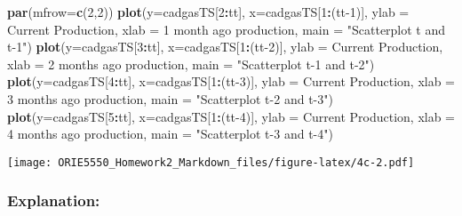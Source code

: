 \documentclass[
]{article}
\newenvironment{Shaded}{\begin{snugshade}}{\end{snugshade}}
\newcommand{\AttributeTok}[1]{\textcolor[rgb]{0.13,0.29,0.53}{#1}}
\newcommand{\DecValTok}[1]{\textcolor[rgb]{0.00,0.00,0.81}{#1}}
\newcommand{\FunctionTok}[1]{\textcolor[rgb]{0.13,0.29,0.53}{\textbf{#1}}}
\newcommand{\NormalTok}[1]{#1}
\newcommand{\SpecialCharTok}[1]{\textcolor[rgb]{0.81,0.36,0.00}{\textbf{#1}}}
\newcommand{\StringTok}[1]{\textcolor[rgb]{0.31,0.60,0.02}{#1}}
\begin{document}
\begin{Shaded}
\begin{Highlighting}[]
\FunctionTok{par}\NormalTok{(}\AttributeTok{mfrow=}\FunctionTok{c}\NormalTok{(}\DecValTok{2}\NormalTok{,}\DecValTok{2}\NormalTok{))}
\FunctionTok{plot}\NormalTok{(}\AttributeTok{y=}\NormalTok{cadgasTS[}\DecValTok{2}\SpecialCharTok{:}\NormalTok{tt], }\AttributeTok{x=}\NormalTok{cadgasTS[}\DecValTok{1}\SpecialCharTok{:}\NormalTok{(tt}\DecValTok{{-}1}\NormalTok{)], }\AttributeTok{ylab =} \StringTok{\textquotesingle{}Current Production\textquotesingle{}}\NormalTok{, }\AttributeTok{xlab =} \StringTok{\textquotesingle{}1 month ago production\textquotesingle{}}\NormalTok{, }\AttributeTok{main =} \StringTok{"Scatterplot t and t{-}1"}\NormalTok{)}
\FunctionTok{plot}\NormalTok{(}\AttributeTok{y=}\NormalTok{cadgasTS[}\DecValTok{3}\SpecialCharTok{:}\NormalTok{tt], }\AttributeTok{x=}\NormalTok{cadgasTS[}\DecValTok{1}\SpecialCharTok{:}\NormalTok{(tt}\DecValTok{{-}2}\NormalTok{)], }\AttributeTok{ylab =} \StringTok{\textquotesingle{}Current Production\textquotesingle{}}\NormalTok{, }\AttributeTok{xlab =} \StringTok{\textquotesingle{}2 months ago production\textquotesingle{}}\NormalTok{, }\AttributeTok{main =} \StringTok{"Scatterplot t{-}1 and t{-}2"}\NormalTok{)}
\FunctionTok{plot}\NormalTok{(}\AttributeTok{y=}\NormalTok{cadgasTS[}\DecValTok{4}\SpecialCharTok{:}\NormalTok{tt], }\AttributeTok{x=}\NormalTok{cadgasTS[}\DecValTok{1}\SpecialCharTok{:}\NormalTok{(tt}\DecValTok{{-}3}\NormalTok{)], }\AttributeTok{ylab =} \StringTok{\textquotesingle{}Current Production\textquotesingle{}}\NormalTok{, }\AttributeTok{xlab =} \StringTok{\textquotesingle{}3 months ago production\textquotesingle{}}\NormalTok{, }\AttributeTok{main =} \StringTok{"Scatterplot t{-}2 and t{-}3"}\NormalTok{)}
\FunctionTok{plot}\NormalTok{(}\AttributeTok{y=}\NormalTok{cadgasTS[}\DecValTok{5}\SpecialCharTok{:}\NormalTok{tt], }\AttributeTok{x=}\NormalTok{cadgasTS[}\DecValTok{1}\SpecialCharTok{:}\NormalTok{(tt}\DecValTok{{-}4}\NormalTok{)], }\AttributeTok{ylab =} \StringTok{\textquotesingle{}Current Production\textquotesingle{}}\NormalTok{, }\AttributeTok{xlab =} \StringTok{\textquotesingle{}4 months ago production\textquotesingle{}}\NormalTok{, }\AttributeTok{main =} \StringTok{"Scatterplot t{-}3 and t{-}4"}\NormalTok{)}
\end{Highlighting}
\end{Shaded}

\texttt{[image: ORIE5550\_Homework2\_Markdown\_files/figure-latex/4c-2.pdf]}

\hypertarget{explanation-2}{%
\subsubsection{Explanation:}\label{explanation-2}}
\end{document}
